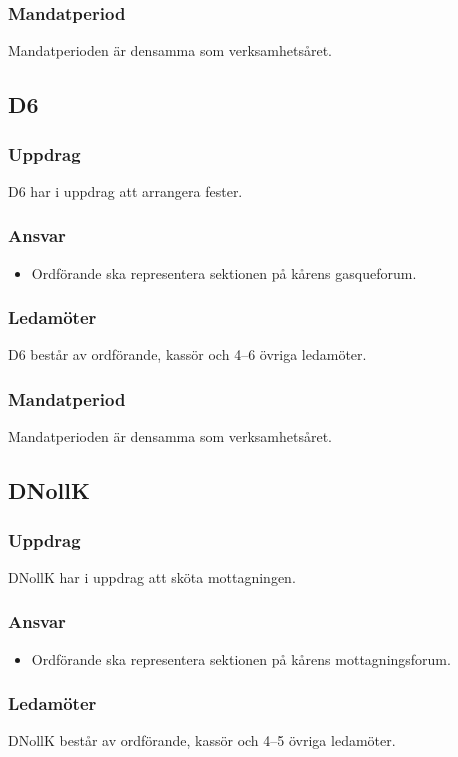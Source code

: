 \subsubsection{Mandatperiod}
Mandatperioden är densamma som verksamhetsåret. 

\subsection{D6}
\subsubsection{Uppdrag}
D6 har i uppdrag att arrangera fester. 
\subsubsection{Ansvar}
\begin{itemize}
    \item Ordförande ska representera sektionen på kårens gasqueforum.
\end{itemize}
\subsubsection{Ledamöter}
D6 består av ordförande, kassör och 4--6 övriga ledamöter. 
\subsubsection{Mandatperiod}
Mandatperioden är densamma som verksamhetsåret. 

\subsection{DNollK}
\subsubsection{Uppdrag}
DNollK har i uppdrag att sköta mottagningen. 
\subsubsection{Ansvar}
\begin{itemize}
    \item Ordförande ska representera sektionen på kårens mottagningsforum.
\end{itemize}
\subsubsection{Ledamöter}
DNollK består av ordförande, kassör och 4--5 övriga ledamöter. 
